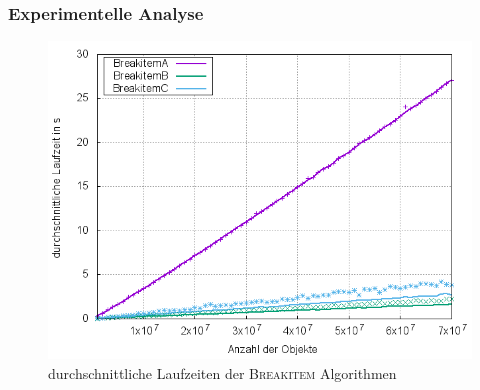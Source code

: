\documentclass{presentation}
\begin{document}
\begin{frame}
    \frametitle{Experimentelle Analyse}
    \begin{figure}[!htb]
        \centering
        \includegraphics[scale=0.4]{res/breakitem_time_average.png}
        \caption{durchschnittliche Laufzeiten der \textsc{Breakitem} Algorithmen}
        \label{fig:breakitem_time_average}
    \end{figure}
\end{frame}



\begin{frame}
\end{frame}



%
%
%
\end{document}
